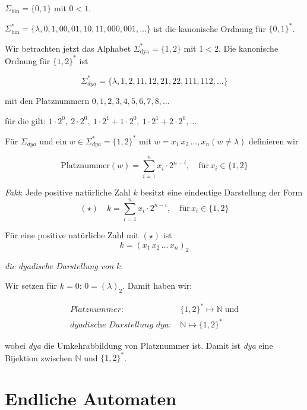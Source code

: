 \documentclass[runningheads,deutsch]{llncs}
\begin{document}
\begin{example}
    $\Sigma_{\text{bin}} = \{0,1\}$ mit $0 < 1$.

    $\Sigma^*_{\text{bin}} = \{ \lambda, 0, 1, 00, 01, 10, 11, 000, 001, \dots \}$ ist die kanonische Ordnung für $\{0, 1\}^*$.
\end{example}

Wir betrachten jetzt das Alphabet $\Sigma^*_{\text{dya}} = \{1, 2\}$ mit $1 < 2$.
Die kanonische Ordnung für $\{1, 2\}^*$ ist 

\[ \Sigma^*_{dya} = \{ \lambda,1, 2, 11, 12, 21, 22, 111, 112, \dots \} \]

mit den Platznummern $0, 1, 2, 3, 4, 5, 6, 7, 8, \dots$

für die gilt: $1\cdot 2^0,\ 2\cdot 2^0,\ 1\cdot 2^1 + 1\cdot 2^0,\ 1\cdot 2^1 + 2\cdot 2^0, \dots$

Für $\Sigma_{dya}$ und ein $w\in \Sigma_{dya}^* = \{1, 2\}^*$ mit $w = x_1\, x_2\, \dots, x_n (w \neq \lambda)$
definieren wir

\[ \text{Platznummer}(w) = \sum^n_{i=1} x_i \cdot 2^{n-i}, \quad \text{für}\, x_i \in \{1, 2\} \]

\textit{Fakt}: Jede positive natürliche Zahl $k$ besitzt eine eindeutige Darstellung der Form
\[ (\star)\quad k = \sum^n_{i=1} x_i \cdot 2^{n-i}, \quad \text{für}\, x_i \in \{1,2\} \]

Für eine positive natürliche Zahl mit $(\star)$ ist
\[ k = (x_1\, x_2\, \dots\, x_n)_2\]

\textit{die dyadische Darstellung von} $k$.

Wir setzen für $k=0$: $0=(\lambda)_2$. Damit haben wir:

\begin{align}
    \textit{Platznummer:}\; & \{1, 2\}^* \mapsto \mathbb{N}\; \text{und} \\
    \textit{dyadische Darstellung dya:}\; & \mathbb{N} \mapsto \{1, 2\}^*
\end{align}

wobei \textit{dya} die Umkehrabbildung von Platznummer ist. Damit ist \textit{dya} eine Bijektion zwischen $\mathbb{N}$ und $\{1,2\}^*$.


\section{Endliche Automaten}
\end{document}
